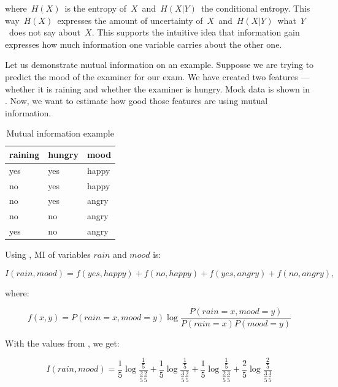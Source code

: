 \noindent
where~$H(X)$~is the entropy of~$X$~and~$H(X|Y)$~the conditional entropy.
This way~$H(X)$~expresses the amount of uncertainty of~$X$~and~$H(X|Y)$~what~$Y$~does not say about~$X$.
This supports the intuitive idea that information gain expresses how much information one variable carries about the other one.

Let us demonstrate mutual information on an example.
Supposse we are trying to predict the mood of the examiner for our exam.
We have created two features --- whether it is raining and whether the examiner is hungry.
Mock data is shown in .
Now, we want to estimate how good those features are using mutual information.


\begin{table}[h!]
 \center
 \begin{tabular}{lll}
	\toprule
	 \textbf{raining} & \textbf{hungry} & \textbf{mood} \\ 
	 \midrule
	 yes & yes & happy \\
	 no & yes & happy \\
	 no & yes & angry \\
	 no & no & angry \\
	 yes  & no & angry \\
	 \bottomrule
 \end{tabular}
 \caption{Mutual information example}
 \label{tab:mi_ex}
\end{table}


Using , MI of variables $\mathit{rain}$ and $\mathit{mood}$ is:


\begin{equation}
	I(\mathit{rain}, \mathit{mood}) =
	f(yes, happy) + f(no, happy) + f(yes, angry) + f(no, angry),
\end{equation}

\noindent
where:

\begin{equation}
	f(x, y) = P(rain=x,mood=y)\log\frac{P(rain=x,mood=y)}{P(rain=x)P(mood=y)}
\end{equation}


With the values from , we get:

\begin{equation}
	I(\mathit{rain}, \mathit{mood}) =
	\frac{1}{5}
		\log \frac{
	\frac{1}{5}
	}{
	\frac{2}{5}
	\frac{2}{5}
	} +
%
	\frac{1}{5}
		\log \frac{
	\frac{1}{5}
	}{
	\frac{3}{5}
	\frac{2}{5}
	} +
%
	\frac{1}{5}
		\log \frac{
	\frac{1}{5}
	}{
	\frac{2}{5}
	\frac{3}{5}
	} +
%
	\frac{2}{5}
		\log \frac{
	\frac{2}{5}
	}{
	\frac{3}{5}
	\frac{3}{5}
	}
\end{equation}

